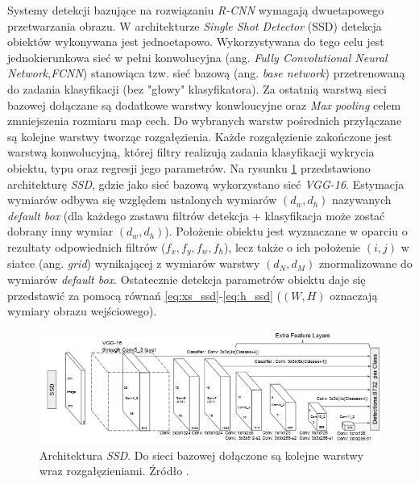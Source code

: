 Systemy detekcji bazujące na rozwiązaniu \emph{R-CNN} wymagają dwuetapowego przetwarzania obrazu.
W architekturze \emph{Single Shot Detector} (SSD) \cite{ssd} detekcja obiektów wykonywana jest jednoetapowo. 
Wykorzystywana do tego celu jest jednokierunkowa sieć w pełni konwolucyjna (ang. \emph{Fully Convolutional Neural Network},\emph{FCNN}) stanowiąca tzw. sieć bazową (ang. \emph{base network}) przetrenowaną do zadania klasyfikacji (bez "głowy" klasyfikatora).
Za ostatnią warstwą sieci bazowej dołączane są dodatkowe warstwy konwloucyjne oraz \emph{Max pooling} celem zmniejszenia rozmiaru map cech.
Do wybranych warstw pośrednich przyłączane są kolejne warstwy tworząc rozgałęzienia.
Każde rozgałęzienie zakończone jest warstwą konwolucyjną, której filtry realizują zadania klasyfikacji wykrycia obiektu, typu oraz regresji jego parametrów. 
Na rysunku \ref{fig:ssd_arch} przedstawiono architekturę \emph{SSD}, gdzie jako sieć bazową wykorzystano sieć \emph{VGG-16}. 
Estymacja wymiarów odbywa się względem ustalonych wymiarów $(d_w, d_h)$ nazywanych \emph{default box} (dla każdego zastawu filtrów detekcja + klasyfikacja może zostać dobrany inny wymiar $(d_w, d_h)$).
Położenie obiektu jest wyznaczane w oparciu o rezultaty odpowiednich filtrów ($f_x, f_y, f_w, f_h$), lecz także o ich położenie $(i,j)$ w siatce (ang. \emph{grid}) wynikającej z wymiarów warstwy $(d_N, d_M)$ znormalizowane do wymiarów \emph{default box}.
Ostatecznie detekcja parametrów obiektu daje się przedstawić za pomocą równań \eqref{eq:xs_ssd}-\eqref{eq:h_ssd} ($(W, H)$ oznaczają wymiary obrazu wejściowego). 
\begin{figure}
    \centering
    \includegraphics[width=0.9\linewidth]{images/ssd_img.png}
    \caption{Architektura \emph{SSD}. Do sieci bazowej dołączone są kolejne warstwy wraz rozgałęzieniami.
    Źródło \cite{ssd}.}
    \label{fig:ssd_arch}
\end{figure}
